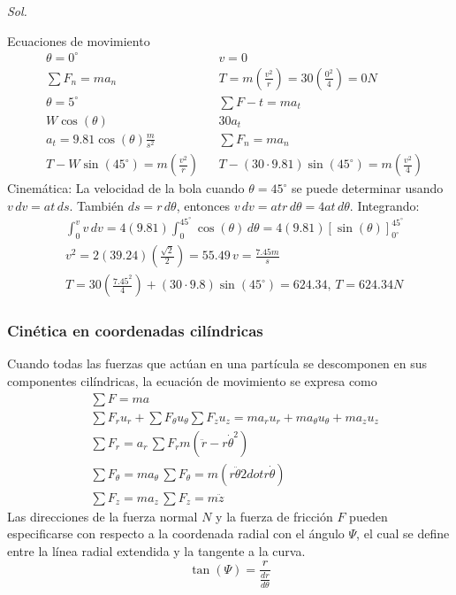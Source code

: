 \textit{ Sol. }

Ecuaciones de movimiento
\begin{align*}
    &\theta = 0^{\circ}&&v = 0\\
    &\sum F_n = ma_n&& T = m\left(\frac{v^2}{r}\right) = 30\left(\frac{0^2}{4}\right) = 0N\\
    &\theta = 5^{\circ}&&\sum F - t = ma_t\\
    &W\cos{(\theta)}&&30a_t\\
    &a_t = 9.81\cos{(\theta)}\frac{m}{s^2}&&\sum F_n = ma_n\\
    &T - W\sin{(45^{\circ})} = m\left(\frac{v^2}{r}\right)&&T -(30\cdot 9.81)\sin{(45^{\circ})} = m\left(\frac{v^2}{4}\right)
\end{align*}
Cinemática: La velocidad de la bola cuando $\theta= 45^{\circ}$ se puede determinar usando $v\,dv=at\,ds$.
También $ds=r\,d\theta$, entonces $v\,dv= atr\,d\theta=4at\, d\theta$. Integrando:
\begin{align*}
    &\int_0^v v\,dv = 4(9.81)\int_0^{45^{\circ}}\cos{(\theta)}\,d\theta = 4(9.81)\left[\sin{(\theta)}\right]_{0^{\circ}}^{45^{\circ}}\\
    &v^2 = 2(39.24)\left(\frac{\sqrt{2}}{2}\right) = 55.49\, v = \frac{7.45m}{s}\\
    &T = 30\left(\frac{7.45^2}{4}\right) +(30\cdot 9.8)\sin{(45^{\circ})} = 624.34,\, T = 624.34N
\end{align*}

\subsubsection{Cinética en coordenadas cilíndricas}

Cuando todas las fuerzas que actúan en una partícula se descomponen en sus componentes cilíndricas, la ecuación de movimiento se expresa como
\begin{align*}
    &\sum F =ma\\
    &\sum F_ru_r + \sum F_{\theta}u_{\theta} \sum F_zu_z = ma_r u_r + ma_{\theta}u_{\theta} + ma_zu_z\\
    &\sum F_r = a_r\, \sum F_r m\left(\ddot{r}- r \dot{\theta}^2\right)\\
    &\sum F_{\theta} = ma_{\theta}\, \sum F_{\theta}= m\left(r\ddot{\theta} 2dot{r}\dot{\theta}\right)\\
    &\sum F_z = ma_z\, \sum F_z= m\ddot{z}
\end{align*}
Las direcciones de la fuerza normal $N$ y la fuerza de fricción $F$ pueden especificarse con respecto a la coordenada radial con el ángulo $\Psi$, el cual se define entre la línea radial extendida y la tangente a la curva.
\begin{equation}
    \tan{(\Psi)} = \frac{r}{\frac{dr}{d\theta}}
\end{equation}

